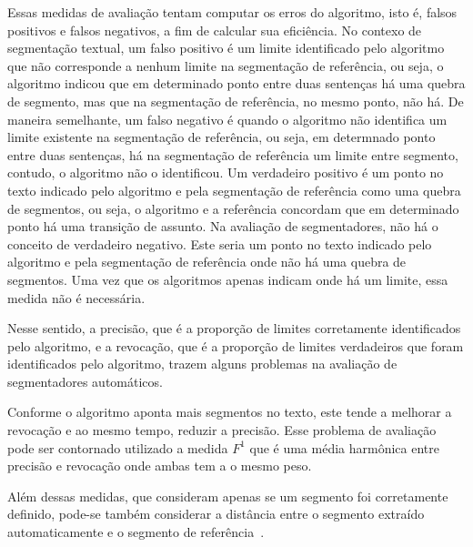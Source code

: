 Essas medidas de avaliação tentam computar os erros do algoritmo, isto é, falsos positivos e falsos negativos, a fim de calcular sua eficiência. 
%
No contexo de segmentação textual, um falso positivo é um limite identificado pelo algoritmo que não corresponde a nenhum limite na segmentação de referência, ou seja, o algoritmo indicou que em determinado ponto entre duas sentenças há uma quebra de segmento, mas que na segmentação de referência, no mesmo ponto, não há. 
%
De maneira semelhante, um falso negativo é quando o algoritmo não identifica um limite existente na segmentação de referência, ou seja, em determnado ponto entre duas sentenças, há na segmentação de referência um limite entre segmento, contudo, o algoritmo não o identificou.
%
Um verdadeiro positivo é um ponto no texto indicado pelo algoritmo e pela segmentação de referência como uma quebra de segmentos, ou seja, o algoritmo e a referência concordam que em determinado ponto há uma transição de assunto.
%
Na avaliação de segmentadores, não há o conceito de verdadeiro negativo. Este seria um ponto no texto indicado pelo algoritmo e pela segmentação de referência onde não há uma quebra de segmentos. Uma vez que os algoritmos apenas indicam onde há um limite, essa medida não é necessária. %

Nesse sentido, 
%
a precisão, que é a proporção de limites corretamente identificados pelo algoritmo, e 
%
a revocação, que é a proporção de limites verdadeiros que foram identificados pelo algoritmo,
%
trazem alguns problemas na avaliação de segmentadores automáticos.
 	
	
Conforme o algoritmo aponta mais segmentos no texto, este tende a melhorar a revocação e ao mesmo tempo, reduzir a precisão. Esse problema de avaliação pode ser contornado utilizado a medida $F^1$ que é uma média harmônica entre precisão e revocação onde ambas tem a o mesmo peso. 

Além dessas medidas, que consideram apenas se um segmento foi corretamente definido, pode-se também considerar a distância entre o segmento extraído automaticamente e o segmento de referência~\cite{Kern2009}.


